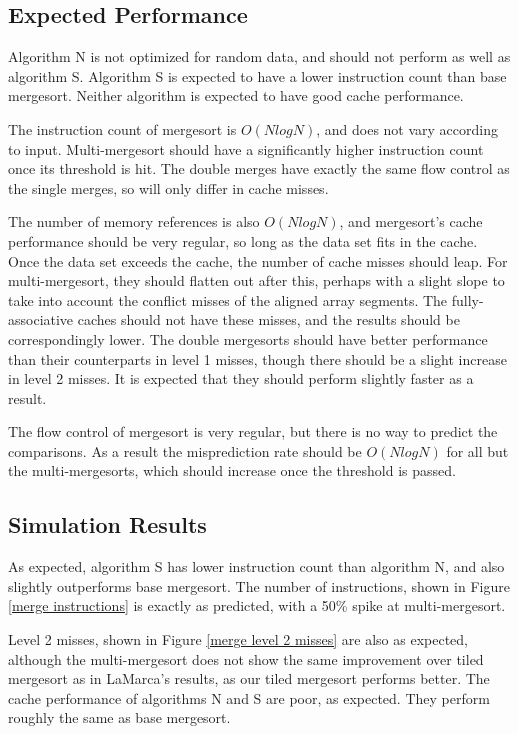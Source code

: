\subsection{Expected Performance}

Algorithm N is not optimized for random data, and should not perform as well as
algorithm S. Algorithm S is expected to have a lower instruction count than base
mergesort. Neither algorithm is expected to have good cache performance.


The instruction count of mergesort is $O(NlogN)$, and does not vary
according to input. Multi-mergesort should have a significantly higher
instruction count once its threshold is hit. The double merges have exactly the
same flow control as the single merges, so will only differ in cache misses.

The number of memory references is also $O(NlogN)$, and mergesort's cache
performance should be very regular, so long as the data set fits in the cache. Once
the data set exceeds the cache, the number of cache misses should leap. For
multi-mergesort, they should flatten out after this, perhaps with a slight
slope to take into account the conflict misses of the aligned array segments. The
fully-associative caches should not have these misses, and the results should be
correspondingly lower. The double mergesorts should have
better performance than their counterparts in level 1 misses, though there
should be a slight increase in level 2 misses. It is expected that they should
perform slightly faster as a result.

The flow control of mergesort is very regular, but there is no way to predict
the comparisons. As a result the misprediction rate should be $O(NlogN)$ for
all but the multi-mergesorts, which should increase once the threshold is
passed.

\subsection{Simulation Results}
\label{Mergesort results}


As expected, algorithm S has lower instruction count than algorithm N, and 
also slightly outperforms base mergesort.  The number of instructions, shown in
Figure \ref{merge instructions} is exactly as predicted, with a 50\% spike at
multi-mergesort. 

Level 2 misses, shown in Figure \ref{merge level 2 misses} are
also as expected, although the multi-mergesort does not show the same
improvement over tiled mergesort as in LaMarca's results, as our tiled mergesort
performs better. The cache performance of algorithms N and S are poor, as
expected. They perform roughly the same as base mergesort.

